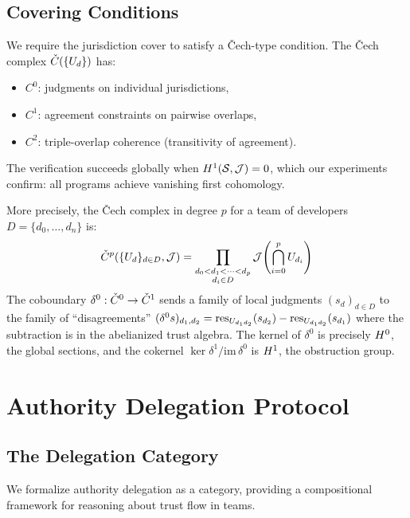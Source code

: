 \documentclass[11pt]{article}
\begin{document}
\subsection{Covering Conditions}

We require the jurisdiction cover to satisfy a \v{C}ech-type condition. The
\v{C}ech complex $\check{C}(\{U_d\})$ has:
\begin{itemize}
  \item $C^0$: judgments on individual jurisdictions,
  \item $C^1$: agreement constraints on pairwise overlaps,
  \item $C^2$: triple-overlap coherence (transitivity of agreement).
\end{itemize}
The verification succeeds globally when $H^{1}(\mathcal{S}, \mathcal{J}) = 0$,
which our experiments confirm: all \expHOneZero{} programs achieve vanishing
first cohomology.

More precisely, the \v{C}ech complex in degree $p$ for a team of developers
$D = \{d_0, \ldots, d_n\}$ is:
\[
  \check{C}^p(\{U_d\}_{d \in D}, \mathcal{J}) =
  \prod_{\substack{d_0 < d_1 < \cdots < d_p \\ d_i \in D}}
  \mathcal{J}\!\left(\bigcap_{i=0}^p U_{d_i}\right)
\]
The coboundary $\delta^0 : \check{C}^0 \to \check{C}^1$ sends a family of local
judgments $(s_d)_{d \in D}$ to the family of ``disagreements''
$(\delta^0 s)_{d_1, d_2} = \mathrm{res}_{U_{d_1 d_2}}(s_{d_2}) - \mathrm{res}_{U_{d_1 d_2}}(s_{d_1})$
where the subtraction is in the abelianized trust algebra. The kernel of
$\delta^0$ is precisely $H^{0}$, the global sections, and the cokernel
$\ker \delta^1 / \mathrm{im}\,\delta^0$ is $H^{1}$, the obstruction group.

\section{Authority Delegation Protocol}\label{sec:delegation}

\subsection{The Delegation Category}

We formalize authority delegation as a category, providing a compositional
framework for reasoning about trust flow in teams.
\end{document}
